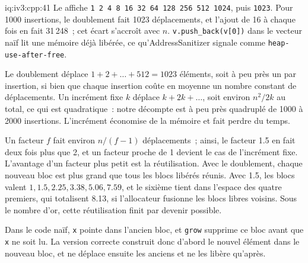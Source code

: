 \begin{solution}{iq:iv3:cpp:41}
Le  affiche \texttt{1 2 4 8 16 32 64 128 256 512 1024}, puis \texttt{1023}. Pour 1000 insertions, le doublement fait 1023 déplacements, et l'ajout de 16 à chaque fois en fait 31\,248~; cet écart s'accroît avec $n$. \texttt{v.push\_back(v[0])} dans le vecteur naïf lit une mémoire déjà libérée, ce qu'AddressSanitizer signale comme \texttt{heap-use-after-free}.

Le doublement déplace $1 + 2 + \dots + 512 = 1023$ éléments, soit à peu près un par insertion, si bien que chaque insertion coûte en moyenne un nombre constant de déplacements. Un incrément fixe $k$ déplace $k + 2k + \dots$, soit environ $n^2 / 2k$ au total, ce qui est quadratique~: notre décompte est à peu près quadruplé de 1000 à 2000 insertions. L'incrément économise de la mémoire et fait perdre du temps.

Un facteur $f$ fait environ $n / (f - 1)$ déplacements~; ainsi, le facteur 1.5 en fait deux fois plus que 2, et un facteur proche de 1 devient le cas de l'incrément fixe. L'avantage d'un facteur plus petit est la réutilisation. Avec le doublement, chaque nouveau bloc est plus grand que tous les blocs libérés réunis. Avec 1.5, les blocs valent $1, 1.5, 2.25, 3.38, 5.06, 7.59$, et le sixième tient dans l'espace des quatre premiers, qui totalisent 8.13, si l'allocateur fusionne les blocs libres voisins. Sous le nombre d'or, cette réutilisation finit par devenir possible.

Dans le code naïf, \texttt{x} pointe dans l'ancien bloc, et \texttt{grow} supprime ce bloc avant que \texttt{x} ne soit lu. La version correcte construit donc d'abord le nouvel élément dans le nouveau bloc, et ne déplace ensuite les anciens et ne les libère qu'après.

\end{solution}

